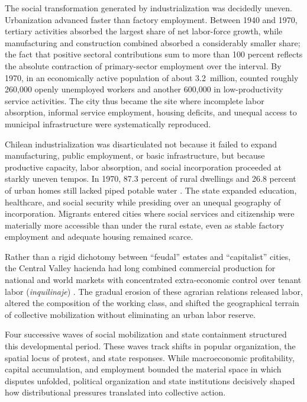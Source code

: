 The social transformation generated by industrialization was decidedly uneven. Urbanization advanced faster than factory employment. Between 1940 and 1970, tertiary activities absorbed the largest share of net labor-force growth, while manufacturing and construction combined absorbed a considerably smaller share; the fact that positive sectoral contributions sum to more than 100 percent reflects the absolute contraction of primary-sector employment over the interval. By 1970, in an economically active population of about 3.2~million, \citet{DeVylder1976} counted roughly 260,000 openly unemployed workers and another 600,000 in low-productivity service activities. The city thus became the site where incomplete labor absorption, informal service employment, housing deficits, and unequal access to municipal infrastructure were systematically reproduced.

Chilean industrialization was disarticulated not because it failed to expand manufacturing, public employment, or basic infrastructure, but because productive capacity, labor absorption, and social incorporation proceeded at starkly uneven tempos. In 1970, 87.3 percent of rural dwellings and 26.8 percent of urban homes still lacked piped potable water \citep{DeVylder1976}. The state expanded education, healthcare, and social security while presiding over an unequal geography of incorporation. Migrants entered cities where social services and citizenship were materially more accessible than under the rural estate, even as stable factory employment and adequate housing remained scarce.

Rather than a rigid dichotomy between ``feudal'' estates and ``capitalist'' cities, the Central Valley hacienda had long combined commercial production for national and world markets with concentrated extra-economic control over tenant labor (\emph{inquilinaje}) \citep{Kay1980}. The gradual erosion of these agrarian relations released labor, altered the composition of the working class, and shifted the geographical terrain of collective mobilization without eliminating an urban labor reserve.

Four successive waves of social mobilization and state containment structured this developmental period. These waves track shifts in popular organization, the spatial locus of protest, and state responses. While macroeconomic profitability, capital accumulation, and employment bounded the material space in which disputes unfolded, political organization and state institutions decisively shaped how distributional pressures translated into collective action.

